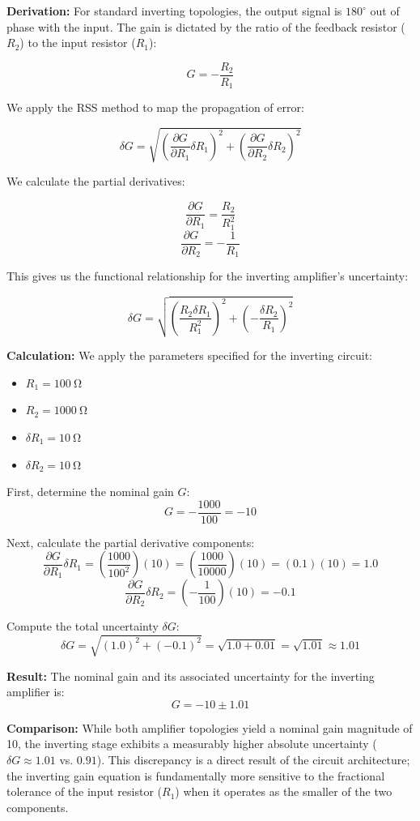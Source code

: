 \documentclass[11pt]{article}
\begin{document}
\textbf{Derivation:}
For standard inverting topologies, the output signal is $180^\circ$ out of phase with the input. The gain is dictated by the ratio of the feedback resistor ($R_2$) to the input resistor ($R_1$):

\[ G = -\frac{R_2}{R_1} \]

We apply the RSS method to map the propagation of error:

\[ \delta G = \sqrt{ \left( \frac{\partial G}{\partial R_1} \delta R_1 \right)^2 + \left( \frac{\partial G}{\partial R_2} \delta R_2 \right)^2 } \]

We calculate the partial derivatives:

\[ \frac{\partial G}{\partial R_1} = \frac{R_2}{R_1^2} \]
\[ \frac{\partial G}{\partial R_2} = -\frac{1}{R_1} \]

This gives us the functional relationship for the inverting amplifier's uncertainty:

\[ \delta G = \sqrt{ \left( \frac{R_2 \delta R_1}{R_1^2} \right)^2 + \left( -\frac{\delta R_2}{R_1} \right)^2 } \]

\textbf{Calculation:}
We apply the parameters specified for the inverting circuit:
\begin{itemize}
  \item $R_1 = \SI{100}{\ohm}$
  \item $R_2 = \SI{1000}{\ohm}$
  \item $\delta R_1 = \SI{10}{\ohm}$
  \item $\delta R_2 = \SI{10}{\ohm}$
\end{itemize}

First, determine the nominal gain $G$:
\[ G = -\frac{1000}{100} = -10 \]

Next, calculate the partial derivative components:
\[ \frac{\partial G}{\partial R_1} \delta R_1 = \left(\frac{1000}{100^2}\right)(10) = \left(\frac{1000}{10000}\right)(10) = (0.1)(10) = 1.0 \]
\[ \frac{\partial G}{\partial R_2} \delta R_2 = \left(-\frac{1}{100}\right)(10) = -0.1 \]

Compute the total uncertainty $\delta G$:
\[ \delta G = \sqrt{ (1.0)^2 + (-0.1)^2 } = \sqrt{ 1.0 + 0.01 } = \sqrt{1.01} \approx 1.01 \]

\textbf{Result:}
The nominal gain and its associated uncertainty for the inverting amplifier is:
\[ G = -10 \pm 1.01 \]

\textbf{Comparison:}
While both amplifier topologies yield a nominal gain magnitude of 10, the inverting stage exhibits a measurably higher absolute uncertainty ($\delta G \approx 1.01$ vs. $0.91$). This discrepancy is a direct result of the circuit architecture; the inverting gain equation is fundamentally more sensitive to the fractional tolerance of the input resistor ($R_1$) when it operates as the smaller of the two components.
\end{document}
